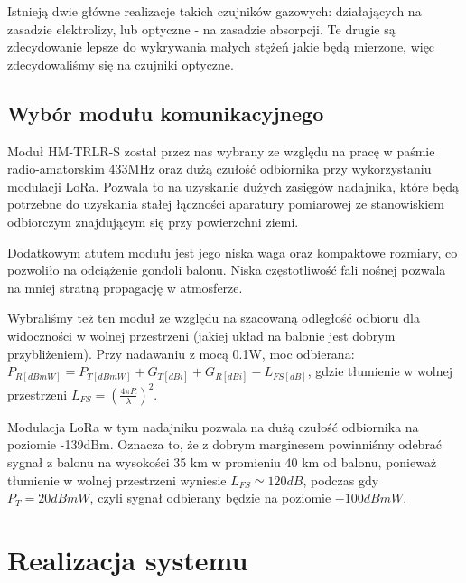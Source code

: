 \documentclass[a4paper,12pt]{article}
\begin{document}
Istnieją dwie główne realizacje takich czujników gazowych: działających na zasadzie elektrolizy, lub optyczne - na zasadzie absorpcji. Te drugie są zdecydowanie lepsze do wykrywania małych stężeń jakie będą mierzone, więc zdecydowaliśmy się na czujniki optyczne.

\subsection{Wybór modułu komunikacyjnego}

Moduł HM-TRLR-S został przez nas wybrany ze względu na pracę w paśmie radio-amatorskim 433MHz oraz dużą czułość odbiornika przy wykorzystaniu modulacji LoRa. Pozwala to na uzyskanie dużych zasięgów nadajnika, które będą potrzebne do uzyskania stałej łączności aparatury pomiarowej ze stanowiskiem odbiorczym znajdującym się przy powierzchni ziemi.

Dodatkowym atutem modułu jest jego niska waga oraz kompaktowe rozmiary, co pozwoliło na odciążenie gondoli balonu. Niska częstotliwość fali nośnej pozwala na mniej stratną propagację w atmosferze.

Wybraliśmy też ten moduł ze względu na szacowaną odległość odbioru dla widoczności w wolnej przestrzeni (jakiej układ na balonie jest dobrym przybliżeniem). Przy nadawaniu z mocą 0.1W, moc odbierana: $P_{R[dBmW]} = P_{T[dBmW]} + G_{T[dBi]} + G_{R[dBi]} -L_{FS[dB]}$, gdzie tłumienie w wolnej przestrzeni $L_{FS} = \left ( \frac{4\pi R}{\lambda}\right )^2$.

Modulacja LoRa w tym nadajniku pozwala na dużą czułość odbiornika na poziomie -139dBm. Oznacza to, że z dobrym marginesem powinniśmy odebrać sygnał z balonu na wysokości 35 km w promieniu 40 km od balonu, ponieważ tłumienie w wolnej przestrzeni wyniesie $L_{FS} \simeq 120 dB$, podczas gdy $P_T = 20 dBmW$, czyli sygnał odbierany będzie na poziomie $-100 dBmW$.

\section{Realizacja systemu}

\end{document}
